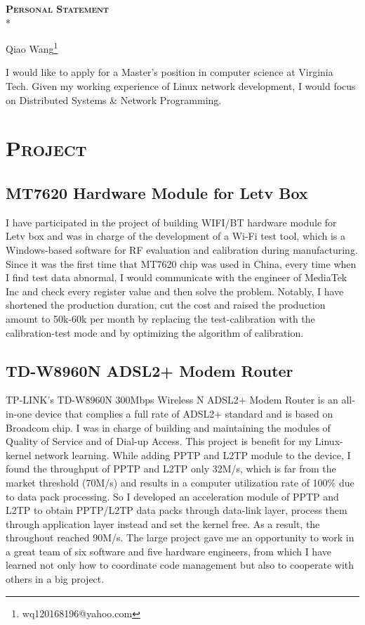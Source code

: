 \documentclass{article}
\begin{document}
	\begin{center}
		\textsc{\textbf{{\LARGE{}Personal Statement}}}\\*
	\end{center}
	\begin{center}
		Qiao Wang\footnote{wq120168196@yahoo.com}
	\end{center}
	
	\begin{multicols}{2}
		I would like to apply for a Master's position in computer science at Virginia Tech. Given my working experience of Linux network development, I would focus on Distributed Systems \& Network Programming.
		\section{\textsc{Project}}
		\subsection{MT7620 Hardware Module for Letv Box}
		I have participated in the project of building WIFI/BT hardware module for Letv box and was in charge of the development of a Wi-Fi test tool, which is a Windows-based software for RF evaluation and calibration during manufacturing. Since it was the first time that MT7620 chip was used in China, every time when I find test data abnormal, I would communicate with the engineer of MediaTek Inc and check every register value and then solve the problem. Notably, I have shortened the production duration, cut the cost and raised the production amount to 50k-60k per month by replacing the test-calibration with the calibration-test mode and by optimizing the algorithm of calibration.
		\subsection{TD-W8960N ADSL2+ Modem Router}
		TP-LINK’s TD-W8960N 300Mbps Wireless N ADSL2+ Modem Router is an all-in-one device that complies a full rate of ADSL2+ standard and is based on Broadcom chip. I was in charge of building and maintaining the modules of Quality of Service and of Dial-up Access. This project is benefit for my Linux-kernel network learning. While adding PPTP and L2TP module to the device, I found the throughput of PPTP and L2TP only 32M/s, which is far from the market threshold (70M/s) and results in a computer utilization rate of 100\% due to data pack processing. So I developed an acceleration module of PPTP and L2TP to obtain PPTP/L2TP data packs through data-link layer, process them through application layer instead and set the kernel free. As a result, the throughout reached 90M/s. The large project gave me an opportunity to work in a great team of six software and five hardware engineers, from which I have learned not only how to coordinate code management but also to cooperate with others in a big project.

\end{multicols}
\end{document}
